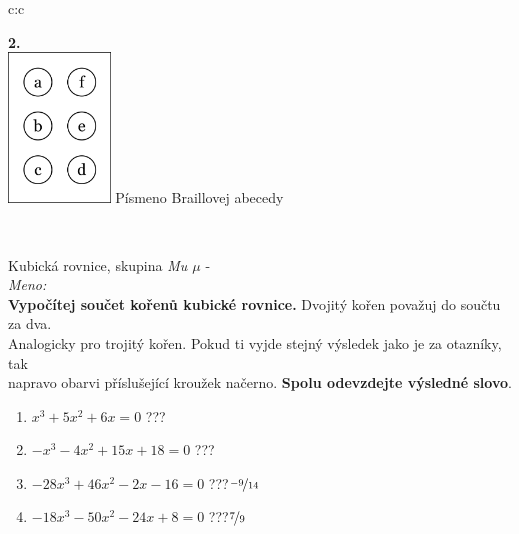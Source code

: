 \documentclass[10pt]{report}
\begin{document}
\begin{tabular}{c:c}
\begin{minipage}[c][99mm][t]{0.49\linewidth}
\begin{center}
\begin{minipage}{0.77\linewidth}
\begin{center}
\begin{varwidth}{\textwidth}
\end{varwidth}
\end{center}
\end{minipage}
\begin{minipage}{0.20\linewidth}
\begin{center}
{\Huge\bfseries 2.} \\[2mm]
\includegraphics[height=40mm]{../images/braille.png}
{\small Písmeno Braillovej abecedy}
\end{center}
\end{minipage}
\end{center}
\end{minipage}
\\ \hdashline
\begin{minipage}[c][99mm][t]{0.49\linewidth}
\begin{center}
\vspace{7mm}
{\huge Kubická rovnice, skupina \textit{Mu $\mu$} -}\\[4.5mm]
\textit{Meno:}\phantom{xxxxxxxxxxxxxxxxxxxxxxxxxxxxxxxxxxxxxxxxxxxxxxxxxxxxxxxxxxxxxxxxx}\\[3.5mm]
\textbf{Vypočítej součet kořenů kubické rovnice.} Dvojitý kořen považuj do součtu za dva.\\Analogicky pro trojitý kořen. Pokud ti vyjde stejný výsledek jako je za otazníky, tak\\napravo obarvi příslušející kroužek načerno. \textbf{Spolu odevzdejte výsledné slovo}.\\[3mm]
\begin{minipage}{0.77\linewidth}
\begin{center}
\begin{varwidth}{\textwidth}
\begin{enumerate}
\large
\item $x^3+5x^2+6x=0$\quad \dotfill\; ???\;\dotfill {}
\item $-x^3-4x^2+15x+18=0$\quad \dotfill\; ???\;\dotfill {}
\item $-28x^3+46x^2-2x-16=0$\quad \dotfill\; ???\;\dotfill \quad $\nicefrac{-9}{14}$
\item $-18x^3-50x^2-24x+8=0$\quad \dotfill\; ???\;\dotfill \quad $\nicefrac{7}{9}$

\end{enumerate}
\end{varwidth}
\end{center}
\end{minipage}
\end{center}
\end{minipage}
\end{tabular}
\end{document}
